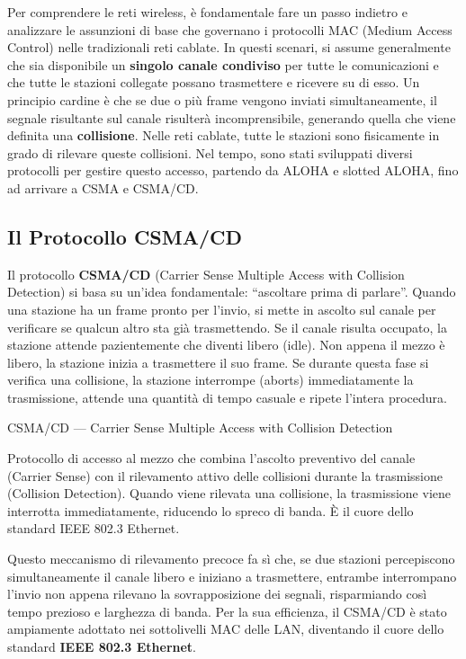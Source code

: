 \documentclass[
  italian,
  openany]{book}
\begin{document}
Per comprendere le reti wireless, è fondamentale fare un passo indietro
e analizzare le assunzioni di base che governano i protocolli MAC
(Medium Access Control) nelle tradizionali reti cablate. In questi
scenari, si assume generalmente che sia disponibile un \textbf{singolo
canale condiviso} per tutte le comunicazioni e che tutte le stazioni
collegate possano trasmettere e ricevere su di esso. Un principio
cardine è che se due o più frame vengono inviati simultaneamente, il
segnale risultante sul canale risulterà incomprensibile, generando
quella che viene definita una \textbf{collisione}. Nelle reti cablate,
tutte le stazioni sono fisicamente in grado di rilevare queste
collisioni. Nel tempo, sono stati sviluppati diversi protocolli per
gestire questo accesso, partendo da ALOHA e slotted ALOHA, fino ad
arrivare a CSMA e CSMA/CD.

\subsection{Il Protocollo CSMA/CD}\label{il-protocollo-csmacd}

Il protocollo \textbf{CSMA/CD} (Carrier Sense Multiple Access with
Collision Detection) si basa su un'idea fondamentale: ``ascoltare prima
di parlare''. Quando una stazione ha un frame pronto per l'invio, si
mette in ascolto sul canale per verificare se qualcun altro sta già
trasmettendo. Se il canale risulta occupato, la stazione attende
pazientemente che diventi libero (idle). Non appena il mezzo è libero,
la stazione inizia a trasmettere il suo frame. Se durante questa fase si
verifica una collisione, la stazione interrompe (aborts) immediatamente
la trasmissione, attende una quantità di tempo casuale e ripete l'intera
procedura.

\begin{calloutdefinition}{CSMA/CD — Carrier Sense Multiple Access with Collision Detection}

Protocollo di accesso al mezzo che combina l'ascolto preventivo del
canale (Carrier Sense) con il rilevamento attivo delle collisioni
durante la trasmissione (Collision Detection). Quando viene rilevata una
collisione, la trasmissione viene interrotta immediatamente, riducendo
lo spreco di banda. È il cuore dello standard IEEE 802.3 Ethernet.

\end{calloutdefinition}

Questo meccanismo di rilevamento precoce fa sì che, se due stazioni
percepiscono simultaneamente il canale libero e iniziano a trasmettere,
entrambe interrompano l'invio non appena rilevano la sovrapposizione dei
segnali, risparmiando così tempo prezioso e larghezza di banda. Per la
sua efficienza, il CSMA/CD è stato ampiamente adottato nei sottolivelli
MAC delle LAN, diventando il cuore dello standard \textbf{IEEE 802.3
Ethernet}.
\end{document}
